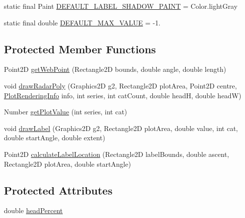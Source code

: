 \begin{DoxyCompactItemize}
\item 
static final Paint \mbox{\hyperlink{classorg_1_1jfree_1_1chart_1_1plot_1_1_spider_web_plot_ad9ca0b9896b31299b3918ad5241e78c5}{D\+E\+F\+A\+U\+L\+T\+\_\+\+L\+A\+B\+E\+L\+\_\+\+S\+H\+A\+D\+O\+W\+\_\+\+P\+A\+I\+NT}} = Color.\+light\+Gray
\item 
static final double \mbox{\hyperlink{classorg_1_1jfree_1_1chart_1_1plot_1_1_spider_web_plot_a971ff79b65cfa3ce082115ab8a2262db}{D\+E\+F\+A\+U\+L\+T\+\_\+\+M\+A\+X\+\_\+\+V\+A\+L\+UE}} = -\/1.
\end{DoxyCompactItemize}
\subsection*{Protected Member Functions}
\begin{DoxyCompactItemize}
\item 
Point2D \mbox{\hyperlink{classorg_1_1jfree_1_1chart_1_1plot_1_1_spider_web_plot_a780a7b8154c4dff47f250ead19ea4de3}{get\+Web\+Point}} (Rectangle2D bounds, double angle, double length)
\item 
void \mbox{\hyperlink{classorg_1_1jfree_1_1chart_1_1plot_1_1_spider_web_plot_a5d35a62569ce99a30339a6d63e64b45e}{draw\+Radar\+Poly}} (Graphics2D g2, Rectangle2D plot\+Area, Point2D centre, \mbox{\hyperlink{classorg_1_1jfree_1_1chart_1_1plot_1_1_plot_rendering_info}{Plot\+Rendering\+Info}} info, int series, int cat\+Count, double headH, double headW)
\item 
Number \mbox{\hyperlink{classorg_1_1jfree_1_1chart_1_1plot_1_1_spider_web_plot_af7faf4094e4946adc14230c3621d27fd}{get\+Plot\+Value}} (int series, int cat)
\item 
void \mbox{\hyperlink{classorg_1_1jfree_1_1chart_1_1plot_1_1_spider_web_plot_a69998f882058bca0a60cf2242e679603}{draw\+Label}} (Graphics2D g2, Rectangle2D plot\+Area, double value, int cat, double start\+Angle, double extent)
\item 
Point2D \mbox{\hyperlink{classorg_1_1jfree_1_1chart_1_1plot_1_1_spider_web_plot_a92fb8cb55bdd9c033c3c3aa8c5b167cc}{calculate\+Label\+Location}} (Rectangle2D label\+Bounds, double ascent, Rectangle2D plot\+Area, double start\+Angle)
\end{DoxyCompactItemize}
\subsection*{Protected Attributes}
\begin{DoxyCompactItemize}
\item 
double \mbox{\hyperlink{classorg_1_1jfree_1_1chart_1_1plot_1_1_spider_web_plot_a271db1ee164aeeff723acff12ab5a6c3}{head\+Percent}}
\end{DoxyCompactItemize}
